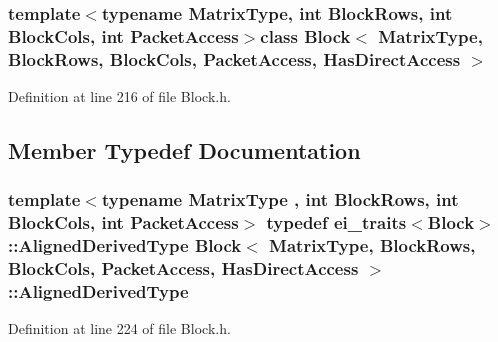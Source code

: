 \subsubsection*{template$<$typename Matrix\-Type, int Block\-Rows, int Block\-Cols, int Packet\-Access$>$class Block$<$ Matrix\-Type, Block\-Rows, Block\-Cols, Packet\-Access, Has\-Direct\-Access $>$}



Definition at line 216 of file Block.\-h.



\subsection{Member Typedef Documentation}
\hypertarget{class_block_3_01_matrix_type_00_01_block_rows_00_01_block_cols_00_01_packet_access_00_01_has_direct_access_01_4_ab969a64c6878b5d4ecfae626e7e2e8d2}{
\subsubsection[{Aligned\-Derived\-Type}]{\setlength{\rightskip}{0pt plus 5cm}template$<$typename Matrix\-Type , int Block\-Rows, int Block\-Cols, int Packet\-Access$>$ typedef {\bf ei\-\_\-traits}$<${\bf Block}$>$\-::{\bf Aligned\-Derived\-Type} {\bf Block}$<$ Matrix\-Type, Block\-Rows, Block\-Cols, {\bf Packet\-Access}, {\bf Has\-Direct\-Access} $>$\-::{\bf Aligned\-Derived\-Type}}}\label{class_block_3_01_matrix_type_00_01_block_rows_00_01_block_cols_00_01_packet_access_00_01_has_direct_access_01_4_ab969a64c6878b5d4ecfae626e7e2e8d2}


Definition at line 224 of file Block.\-h.



